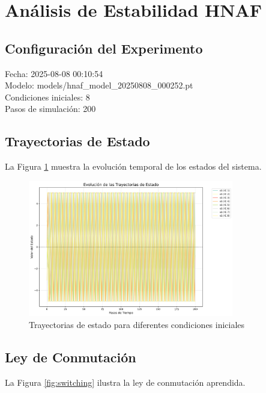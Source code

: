 \section{Análisis de Estabilidad HNAF}

\subsection{Configuración del Experimento}
Fecha: 2025-08-08 00:10:54\\Modelo: models/hnaf_model_20250808_000252.pt\\Condiciones iniciales: 8\\Pasos de simulación: 200

\subsection{Trayectorias de Estado}
La Figura \ref{fig:trajectories} muestra la evolución temporal de los estados del sistema.

\begin{figure}[h]
\centering
\includegraphics[width=0.8\textwidth]{plot_trajectories.png}
\caption{Trayectorias de estado para diferentes condiciones iniciales}
\label{fig:trajectories}
\end{figure}

\subsection{Ley de Conmutación}
La Figura \ref{fig:switching} ilustra la ley de conmutación aprendida.

